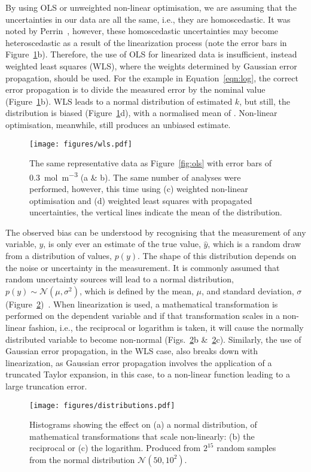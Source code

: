 \documentclass[journal=jceda8,manuscript=article]{achemso}
\begin{document}
By using OLS or unweighted non-linear optimisation, we are assuming that the uncertainties in our data are all the same, i.e., they are homoscedastic. 
It was noted by Perrin~\cite{perrin_linear_2017}, however, these homoscedastic uncertainties may become heteroscedastic as a result of the linearization process (note the error bars in Figure~\ref{fig:wls}b). 
Therefore, the use of OLS for linearized data is insufficient, instead weighted least squares (WLS), where the weights determined by Gaussian error propagation, should be used.
For the example in Equation~\ref{eqn:log}, the correct error propagation is to divide the measured error by the nominal value (Figure~\ref{fig:wls}b).
WLS leads to a normal distribution of estimated $k$, but still, the distribution is biased (Figure~\ref{fig:wls}d), with a normalised mean of .
Non-linear optimisation, meanwhile, still produces an unbiased estimate.
%
\begin{figure}
  \texttt{[image: figures/wls.pdf]}
  \caption{
    The same representative data as Figure~\ref{fig:ols} with error bars of \SI{0.3}{{\mol\m^{-3}}} (a \& b).
    The same number of analyses were performed, however, this time using (c) weighted non-linear optimisation and (d) weighted least squares with propagated uncertainties, the vertical lines indicate the mean of the distribution. 
    }
  \label{fig:wls}
\end{figure}
%

The observed bias can be understood by recognising that the measurement of any variable, $y$, is only ever an estimate of the true value, $\hat{y}$, which is a random draw from a distribution of values, $p(y)$. 
The shape of this distribution depends on the noise or uncertainty in the measurement. 
It is commonly assumed that random uncertainty sources will lead to a normal distribution, $p(y) \sim \mathcal{N}(\mu, \sigma^2)$, which is defined by the mean, $\mu$, and standard deviation, $\sigma$ (Figure~\ref{fig:distributions})~\cite{monk_math_2010}.
When linearization is used, a mathematical transformation is performed on the dependent variable and if that transformation scales in a non-linear fashion, i.e., the reciprocal or logarithm is taken, it will cause the normally distributed variable to become non-normal (Figs.~\ref{fig:distributions}b \&~\ref{fig:distributions}c).
Similarly, the use of Gaussian error propagation, in the WLS case, also breaks down with linearization, as Gaussian error propagation involves the application of a truncated Taylor expansion, in this case, to a non-linear function leading to a large truncation error.
%
\begin{figure}
  \texttt{[image: figures/distributions.pdf]}
  \caption{  
    Histograms showing the effect on (a) a normal distribution, of mathematical transformations that scale non-linearly: (b) the reciprocal or (c) the logarithm. 
    Produced from $2^{15}$ random samples from the normal distribution $\mathcal{N}(50, 10^2)$.
    }
  \label{fig:distributions}
\end{figure}
%
\end{document}
